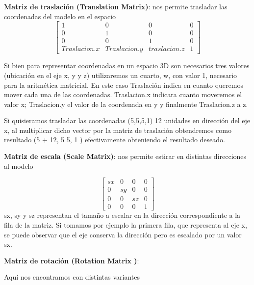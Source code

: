 \documentclass[a4paper]{article}
\begin{document}
\textbf{Matriz de traslación (Translation Matrix)}: nos permite trasladar las coordenadas del modelo en el espacio   
 \[
\begin{bmatrix}
1 & 0 & 0 & 0 \\
0 & 1 & 0 & 0 \\
0 & 0 & 1 & 0 \\
Traslacion.x & Traslacion.y & traslacion.z & 1  
\end{bmatrix}
\]


Si bien para representar  coordenadas en un espacio 3D son necesarios tres valores (ubicación en el eje x, y y z) utilizaremos un cuarto, w, con valor 1, necesario para la aritmética matricial. En este caso Traslación indica en cuanto queremos mover cada una de las coordenadas. Traslacion.x indicara cuanto moveremos el valor x;  Traslacion.y el valor de la coordenada en y y finalmente Traslacion.z a z.
\par Si quisieramos trasladar las coordenadas (5,5,5,1) 12 unidades en dirección del eje x, al multiplicar dicho vector por la matriz de traslación obtendremos como resultado (5 + 12, 5 5, 1 ) efectivamente obteniendo el resultado deseado.  

\textbf{Matriz de escala (Scale Matrix)}: nos permite estirar en distintas direcciones al modelo
 
\[
\begin{bmatrix}
sx & 0 & 0 & 0 \\
0 & sy & 0 & 0 \\
0 & 0 & sz & 0 \\
0 & 0 & 0 & 1  
\end{bmatrix}
\]
sx, sy y sz representan el tamaño a escalar en la dirección correspondiente a la fila de la matriz. Si tomamos por ejemplo la primera fila, que representa al eje x, se puede observar que el eje conserva la dirección pero es escalado por un valor sx. 



\textbf{Matriz de rotación (Rotation Matrix )}:


 Aquí nos encontramos con distintas variantes 
 
 
 
\end{document}
